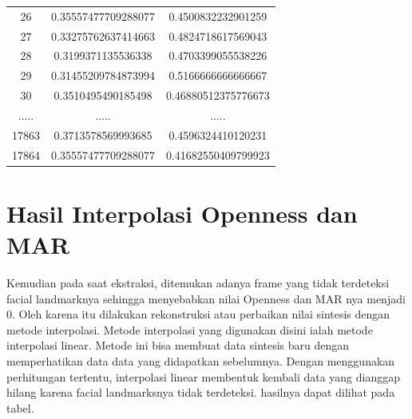 \begin{longtable}{|c|c|c|}
26    & 0.35557477709288077 & 0.4500832232901259  \\
27    & 0.33275762637414663 & 0.4824718617569043  \\
28    & 0.3199371135536338  & 0.4703399055538226  \\
29    & 0.31455209784873994 & 0.5166666666666667  \\
30    & 0.3510495490185498  & 0.46880512375776673 \\
..... & ..... & ..... \\
17863 & 0.3713578569993685  & 0.4596324410120231  \\
17864 & 0.35557477709288077 & 0.41682550409799923 \\

  \hline
\end{longtable}

\section{Hasil Interpolasi Openness dan MAR}
\label{sec:Interpolasihasil}

Kemudian pada saat ekstraksi, ditemukan adanya frame yang tidak terdeteksi facial landmarknya sehingga menyebabkan nilai Openness dan MAR nya menjadi 0. Oleh karena itu dilakukan rekonstruksi atau perbaikan nilai sintesis dengan metode interpolasi. Metode interpolasi yang digunakan disini ialah metode interpolasi linear. Metode ini bisa membuat data sintesis baru dengan memperhatikan data data yang didapatkan sebelumnya. Dengan menggunakan perhitungan tertentu, interpolasi linear membentuk kembali data yang dianggap hilang karena facial landmarksnya tidak terdeteksi. hasilnya dapat dilihat pada tabel.

